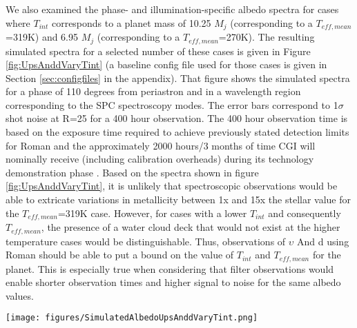 \documentclass[12pt, letterpaper]{aastex631}
\begin{document}
We also examined the phase- and illumination-specific albedo spectra for cases where $T_{int}$ corresponds to a planet mass of 10.25 $M_{j}$ (corresponding to a $T_{eff, mean}$=319K) and 6.95 $M_{j}$ (corresponding to a $T_{eff, mean}$=270K)\citep{marley_mark_2018_1309035}.  The resulting simulated spectra for a selected number of these cases is given in Figure \ref{fig:UpsAnddVaryTint} (a baseline config file used for those cases is given in Section \ref{sec:configfiles} in the appendix).  That figure shows the simulated spectra for a phase of 110 degrees from periastron and in a wavelength region corresponding to the SPC spectroscopy modes. The error bars correspond to 1$\sigma$ shot noise at R=25 for a 400 hour observation.  The 400 hour observation time is based on the exposure time required to achieve previously stated detection limits for Roman \citep{2019arXiv190104050B} and the approximately 2000 hours/3 months of time CGI will nominally receive (including calibration overheads) during its technology demonstration phase \citep{2019arXiv190205569A}. Based on the spectra shown in figure \ref{fig:UpsAnddVaryTint}, it is unlikely that spectroscopic observations would be able to extricate variations in metallicity between 1x and 15x the stellar value for the $T_{eff, mean}$=319K case.  However, for cases with a lower $T_{int}$ and consequently $T_{eff, mean}$, the presence of a water cloud deck that would not exist at the higher temperature cases would be distinguishable.  Thus, observations of $\upsilon$ And d using Roman should be able to put a bound on the value of $T_{int}$ and $T_{eff, mean}$ for the planet.  This is especially true when considering that filter observations would enable shorter observation times and higher signal to noise for the same albedo values. 

\begin{figure*}[t]
  \centering
  \texttt{[image: figures/SimulatedAlbedoUpsAnddVaryTint.png]}
  \caption{Simulated albedo spectra for $\upsilon$ And d for a variety of metallicity and $T_{int}$ values. Spectra are produced using the observational parameters given in Table \ref{tab:upsanddparam} and a phase of 110 degrees from periastron, which corresponds to one of the most advantageous illumination phases for the planet. The majority of the spectra plotted are for the case where $T_{int}$ corresponds to a planet mass of 10.25 $M_{j}$, but we also plot a case for the lower bound mass of 6.95 $M_{j}$ (the upper bound is very close to the 10.25 $M_{j}$ values). Error bars are 1-sigma values at R=25 for a 400 hour observation; based on those, Roman observations may be able to put bounds on the interior temperature and possibly the metallicity of the planet.  Cases with tholin hazes were also run but not included since transmissivity was $\sim$$>$99.9\% for the haze in this spectral region.}  
  \label{fig:UpsAnddVaryTint}
\end{figure*}
\end{document}
